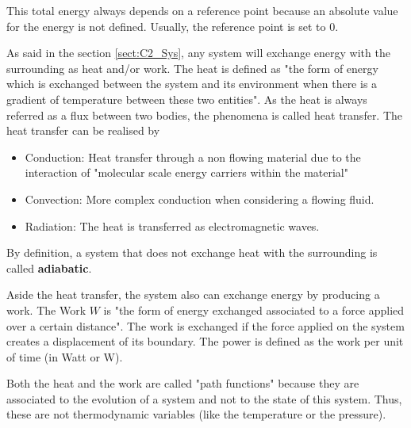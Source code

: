 This total energy always depends on a reference point because an absolute value for the energy is not defined. Usually, the reference point is set to 0.

As said in the section \ref{sect:C2_Sys}, any system will exchange energy with the surrounding as heat and/or work. The heat is defined as "the form of energy which is exchanged between the system and its environment when there is a gradient of temperature between these two entities". As the heat is always referred as a flux between two bodies, the phenomena is called heat transfer. The heat transfer can be realised by
\begin{itemize}
    \item Conduction: Heat transfer through a non flowing material due to the interaction of "molecular scale energy carriers within the material"\cite{GregoryNellis2015}
    \item Convection: More complex conduction when considering a flowing fluid.
    \item Radiation: The heat is transferred as electromagnetic waves.
\end{itemize}

By definition, a system that does not exchange heat with the surrounding is called \textbf{adiabatic}.

Aside the heat transfer, the system also can exchange energy by producing a work. The Work $W$ is "the form of energy exchanged associated to a force applied over a certain distance". The work is exchanged if the force applied on the system creates a displacement of its boundary. The power is defined as the work per unit of time (in Watt or W).

Both the heat and the work are called "path functions" because they are associated to the evolution of a system and not to the state of this system. Thus, these are not thermodynamic variables (like the temperature or the pressure).